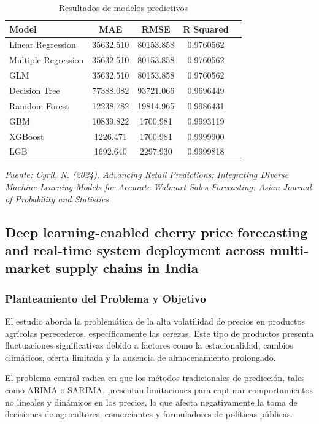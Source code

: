 \begin{table}[h!]
	\centering
	\begin{tabular}{lcccc}
		\hline
		Model & MAE & RMSE & R Squared  \\ \hline
		Linear Regression & 35632.510 &  80153.858 & 0.9760562  \\
		Multiple Regression & 35632.510 & 80153.858 & 0.9760562 \\
		GLM & 35632.510 & 80153.858 & 0.9760562 \\
		Decision Tree & 77388.082 & 93721.066 & 0.9696449 \\
		Ramdom Forest & 12238.782 & 19814.965 & 0.9986431 \\
		GBM & 10839.822 & 1700.981 & 0.9993119 \\
		XGBoost & 1226.471 & 1700.981 & 0.9999900 \\
		LGB & 1692.640 & 2297.930 &  0.9999818\\ \hline
		
	\end{tabular}
	\caption{Resultados de modelos predictivos}
	\textit{Fuente: Cyril, N. (2024). Advancing Retail Predictions: Integrating Diverse Machine Learning Models for Accurate Walmart Sales Forecasting. Asian Journal of Probability and Statistics}
	
	\label{tabla:15}
\end{table}


\subsection{Deep learning-enabled cherry price forecasting and real-time system deployment across multi-market supply chains in India \citep{shaheen2026cherry}}

\subsubsection{Planteamiento del Problema y Objetivo}

El estudio aborda la problemática de la alta volatilidad de precios en productos agrícolas perecederos, específicamente las cerezas. Este tipo de productos presenta fluctuaciones significativas debido a factores como la estacionalidad, cambios climáticos, oferta limitada y la ausencia de almacenamiento prolongado.

El problema central radica en que los métodos tradicionales de predicción, tales como ARIMA o SARIMA, presentan limitaciones para capturar comportamientos no lineales y dinámicos en los precios, lo que afecta negativamente la toma de decisiones de agricultores, comerciantes y formuladores de políticas públicas.

